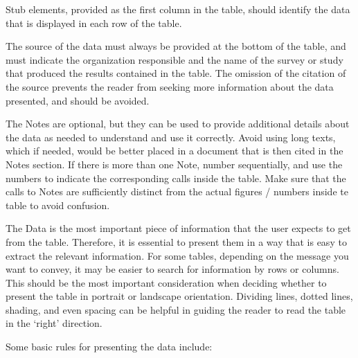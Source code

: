 \documentclass[
  12pt,
]{book}
\begin{document}
Stub elements, provided as the first column in the table, should identify the data that is displayed in each row of the table.

The source of the data must always be provided at the bottom of the table, and must indicate the organization responsible and the name of the survey or study that produced the results contained in the table. The omission of the citation of the source prevents the reader from seeking more information about the data presented, and should be avoided.

The Notes are optional, but they can be used to provide additional details about the data as needed to understand and use it correctly. Avoid using long texts, which if needed, would be better placed in a document that is then cited in the Notes section. If there is more than one Note, number sequentially, and use the numbers to indicate the corresponding calls inside the table. Make sure that the calls to Notes are sufficiently distinct from the actual figures / numbers inside te table to avoid confusion.

The Data is the most important piece of information that the user expects to get from the table. Therefore, it is essential to present them in a way that is easy to extract the relevant information. For some tables, depending on the message you want to convey, it may be easier to search for information by rows or columns. This should be the most important consideration when deciding whether to present the table in portrait or landscape orientation. Dividing lines, dotted lines, shading, and even spacing can be helpful in guiding the reader to read the table in the `right' direction.

Some basic rules for presenting the data include:
\end{document}
